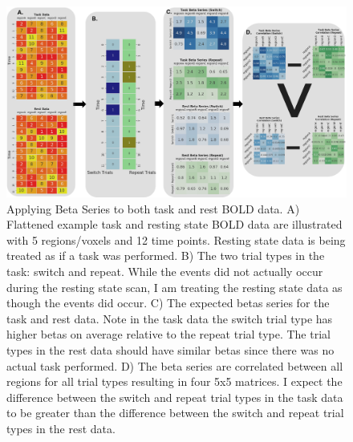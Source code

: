 \documentclass[phd,appendix,figures]{uithesis}
\begin{document}
\begin{itemize}
\begin{figure}[H]%
	\centering
	\includegraphics[width=1\linewidth]{validation_of_beta_series_pt_1}
	\caption{Applying Beta Series to both task and rest BOLD data.
	A) Flattened example task and resting state BOLD data are illustrated with 5 regions/voxels and 12 time points.
	Resting state data is being treated as if a task was performed.
	B) The two trial types in the task: switch and repeat. While the events did not actually occur during the resting state scan,
	I am treating the resting state data as though the events did occur.
	C) The expected betas series for the task and rest data.
	Note in the task data the switch trial type has higher betas on average relative to the repeat trial type.
	The trial types in the rest data should have similar betas since there was no actual task performed.
	D) The beta series are correlated between all regions for all trial types resulting in four 5x5 matrices.
	I expect the difference between the switch and repeat trial types in the task data to be greater than
	the difference between the switch and repeat trial types in the rest data.}
	\label{fig:validation_of_beta_series_pt_1}
\end{figure}


\end{itemize}
\end{document}
